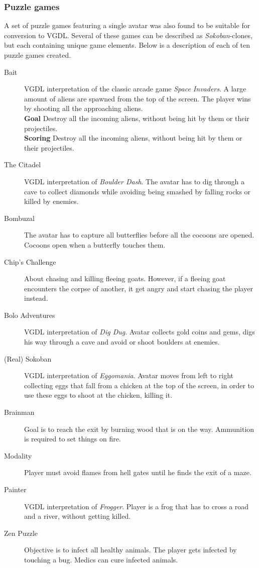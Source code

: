 \documentclass[a4paper,titlepage,final, twoside]{report}
\begin{document}
\subsubsection*{Puzzle games}
A set of puzzle games featuring a single avatar was also found to be suitable for conversion to VGDL. 
Several of these games can be described as \textit{Sokoban}-clones, but each containing unique game elements.
Below is a description of each of ten puzzle games created.

\begin{description}
\item [Bait] VGDL interpretation of the classic arcade game \emph{Space Invaders}. A large amount of aliens are spawned from the top of the screen. The player wins by shooting all the approaching aliens.\\
\textbf{Goal} Destroy all the incoming aliens, without being hit by them or their projectiles.\\
\textbf{Scoring} Destroy all the incoming aliens, without being hit by them or their projectiles.
\item [The Citadel] VGDL interpretation of \emph{Boulder Dash}. The avatar has to dig through a cave to collect diamonds while avoiding being smashed by falling rocks or killed by enemies. 
\item [Bombuzal] The avatar has to capture all butterflies before all the cocoons are opened. Cocoons open when a butterfly touches them.
\item [Chip's Challenge] About chasing and killing fleeing goats. However, if a fleeing goat encounters the corpse of another, it get angry and start chasing the player instead.
\item [Bolo Adventures] VGDL interpretation of \emph{Dig Dug}. Avatar collects gold coins and gems, digs his way through a cave and avoid or shoot boulders at enemies.
\item [(Real) Sokoban] VGDL interpretation of \emph{Eggomania}. Avatar moves from left to right collecting eggs that fall from a chicken at the top of the screen, in order to use these eggs to shoot at the chicken, killing it.
\item [Brainman] Goal is to reach the exit by burning wood that is on the way. Ammunition is required to set things on fire.
\item [Modality] Player must avoid flames from hell gates until he finds the exit of a maze.
\item [Painter] VGDL interpretation of \emph{Frogger}. Player is a frog that has to cross a road and a river, without getting killed.
\item [Zen Puzzle] Objective is to infect all healthy animals. The player gets infected by touching a bug. Medics can cure infected animals.
\end{description}
\end{document}
